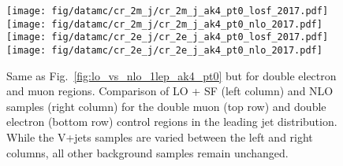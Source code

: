 \begin{figure}[htbp]
    \begin{center}
        \texttt{[image: fig/datamc/cr\_2m\_j/cr\_2m\_j\_ak4\_pt0\_losf\_2017.pdf]}
        \texttt{[image: fig/datamc/cr\_2m\_j/cr\_2m\_j\_ak4\_pt0\_nlo\_2017.pdf]} \\
        \texttt{[image: fig/datamc/cr\_2e\_j/cr\_2e\_j\_ak4\_pt0\_losf\_2017.pdf]}
        \texttt{[image: fig/datamc/cr\_2e\_j/cr\_2e\_j\_ak4\_pt0\_nlo\_2017.pdf]} \\
    \end{center}
    \caption{Same as Fig.~\ref{fig:lo_vs_nlo_1lep_ak4_pt0} but for double electron and muon regions. Comparison of LO + SF (left column) and NLO samples (right column) for the double muon (top row) and double electron (bottom row) control regions in the leading jet \pt distribution. While the V+jets samples are varied between the left and right columns, all other background samples remain unchanged.}
    \label{fig:lo_vs_nlo_2lep_ak4_pt0}
\end{figure}
